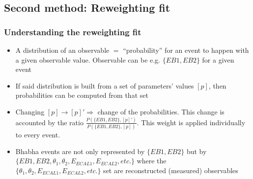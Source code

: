 \documentclass[handout]{beamer}
\begin{document}
\subsection{Second method: Reweighting fit}
\begin{frame}
\frametitle{Understanding the reweighting fit}
\begin{itemize}
  \item A \alert{distribution} of an observable $=$ \alert{``probability''} for
  an event to happen with a given observable value. Observable can be e.g.
  $\{EB1,EB2\}$ for a given event%
  \item If said distribution is built from a set of parameters' values
  $[p]$, then probabilities can be computed from that set
  \item Changing $[p]\to [p]'\Rightarrow$ change of the probabilities. This
  change is accounted by the ratio $\frac{P(\{EB1,EB2\},
  [p]')}{P(\{EB1,EB2\},[p])}$. This weight is applied individually to every
  event.
  \item Bhabha events are not only represented by $\{EB1,EB2\}$ but by
  $\{EB1,EB2,\theta_1,\theta_2,E_{ECAL1},E_{ECAL2},etc.\}$ where the
  $\{\theta_1,\theta_2,E_{ECAL1},E_{ECAL2},etc.\}$ set are reconstructed
  (measured) observables
\end{itemize}
\end{frame}
\end{document}
